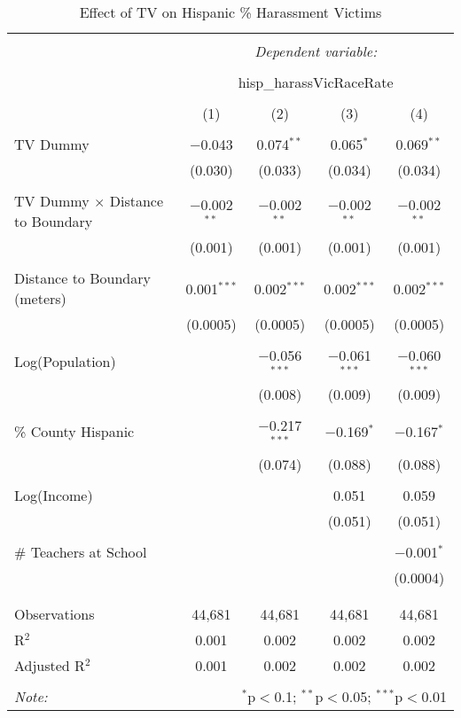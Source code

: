 
\begin{table}[!htbp] \centering 
  \caption{Effect of TV on Hispanic \% Harassment Victims} 
  \label{} 
\begin{tabular}{@{\extracolsep{-2pt}}lcccc} 
\\[-1.8ex]\hline 
\hline \\[-1.8ex] 
 & \multicolumn{4}{c}{\textit{Dependent variable:}} \\ 
\cline{2-5} 
\\[-1.8ex] & \multicolumn{4}{c}{hisp\_harassVicRaceRate} \\ 
\\[-1.8ex] & (1) & (2) & (3) & (4)\\ 
\hline \\[-1.8ex] 
 TV Dummy & $-$0.043 & 0.074$^{**}$ & 0.065$^{*}$ & 0.069$^{**}$ \\ 
  & (0.030) & (0.033) & (0.034) & (0.034) \\ 
  & & & & \\ 
 TV Dummy $\times$ Distance to Boundary & $-$0.002$^{**}$ & $-$0.002$^{**}$ & $-$0.002$^{**}$ & $-$0.002$^{**}$ \\ 
  & (0.001) & (0.001) & (0.001) & (0.001) \\ 
  & & & & \\ 
 Distance to Boundary (meters) & 0.001$^{***}$ & 0.002$^{***}$ & 0.002$^{***}$ & 0.002$^{***}$ \\ 
  & (0.0005) & (0.0005) & (0.0005) & (0.0005) \\ 
  & & & & \\ 
 Log(Population) &  & $-$0.056$^{***}$ & $-$0.061$^{***}$ & $-$0.060$^{***}$ \\ 
  &  & (0.008) & (0.009) & (0.009) \\ 
  & & & & \\ 
 \% County Hispanic &  & $-$0.217$^{***}$ & $-$0.169$^{*}$ & $-$0.167$^{*}$ \\ 
  &  & (0.074) & (0.088) & (0.088) \\ 
  & & & & \\ 
 Log(Income) &  &  & 0.051 & 0.059 \\ 
  &  &  & (0.051) & (0.051) \\ 
  & & & & \\ 
 \# Teachers at School &  &  &  & $-$0.001$^{*}$ \\ 
  &  &  &  & (0.0004) \\ 
  & & & & \\ 
\hline \\[-1.8ex] 
Observations & 44,681 & 44,681 & 44,681 & 44,681 \\ 
R$^{2}$ & 0.001 & 0.002 & 0.002 & 0.002 \\ 
Adjusted R$^{2}$ & 0.001 & 0.002 & 0.002 & 0.002 \\ 
\hline 
\hline \\[-1.8ex] 
\textit{Note:}  & \multicolumn{4}{r}{$^{*}$p$<$0.1; $^{**}$p$<$0.05; $^{***}$p$<$0.01} \\ 
\end{tabular} 
\end{table} 

